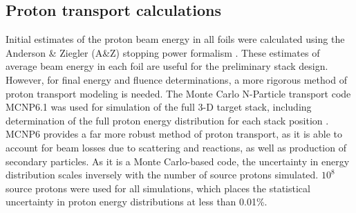\documentclass[3p]{elsarticle}
\begin{document}
\subsection{Proton transport calculations}\label{sec:proton_transport}


Initial estimates of the proton beam energy in all foils were calculated using the Anderson \& Ziegler (A\&Z) stopping power formalism \cite{Andersen_Ziegler_1977,Ziegler1985,Ziegler1999}.
These estimates of average beam energy in each foil are useful for the preliminary stack design.
However, for final energy and fluence determinations, a more rigorous method of proton transport modeling is needed.
The Monte Carlo N-Particle transport code MCNP6.1 was used for simulation of the full 3-D target stack, including determination of the full proton energy distribution for each stack position   \cite{Goorley2012}.
MCNP6 provides a far more robust method of proton transport, as it is able to account for beam losses due to scattering and reactions, as well as production of secondary particles.
As it is a Monte Carlo-based code, the uncertainty in energy distribution scales inversely with the number of source protons simulated.  $10^8$ source protons were used for all simulations, which places the statistical uncertainty in proton energy distributions at less than 0.01\%.
\end{document}
